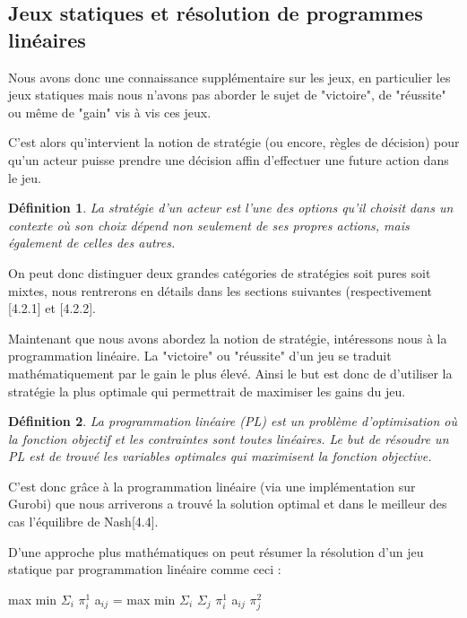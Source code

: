 \documentclass[a4paper, 12pt, twoside]{article}
\newtheorem{definition}{Définition}
\begin{document}
\subsection{Jeux statiques et résolution de programmes linéaires}
Nous avons donc une connaissance supplémentaire sur les jeux, en particulier les \textsf{jeux statiques} mais nous n'avons pas aborder le sujet de "victoire", de "réussite" ou même de "gain" vis à vis ces jeux. \newline

C'est alors qu'intervient la notion de \textsf{stratégie} (ou encore, règles de décision) pour  qu'un acteur puisse prendre une décision affin d'effectuer une future action dans le jeu.\newline
\begin{definition}
La stratégie d’un acteur est l’une des options qu’il choisit dans un contexte où son choix dépend non seulement de ses propres actions, mais également de celles des autres.
\end{definition}

On peut donc distinguer deux grandes catégories de \textsf{stratégies} soit pures soit mixtes, nous rentrerons en détails dans les sections suivantes (respectivement [4.2.1] et [4.2.2]. \newline

Maintenant que nous avons abordez la notion de stratégie, intéressons nous à la programmation linéaire. La "victoire" ou "réussite" d'un jeu se traduit mathématiquement par le \textsf{gain} le plus élevé. Ainsi le but est donc de d'utiliser la stratégie la plus optimale qui permettrait de maximiser les \textsf{gains} du jeu.

\begin{definition}
La programmation linéaire (PL) est un problème d'optimisation où la fonction objectif et les contraintes sont toutes linéaires. Le but de résoudre un PL est de trouvé les variables optimales qui maximisent la fonction objective.
\end{definition}

C'est donc grâce à la \textsf{programmation linéaire} (via une implémentation sur \textsf{Gurobi}) que nous arriverons a trouvé la solution optimal et dans le meilleur des cas \textsf{l'équilibre de Nash}[4.4]. \newline

D'une approche plus mathématiques on peut résumer la résolution d'un \textsf{jeu statique} par \textsf{programmation linéaire} comme ceci : \newline
\begin{center}
max  min $ \Sigma_{i}$ $\pi_{i}^{1}$ a$ _{ij} $ = max min $ \Sigma _{i} $ $ \Sigma _{j} $ $\pi_{i}^{1}$ a$ _{ij} $ $ \pi_{j}^{2} $
\end{center}
\end{document}
